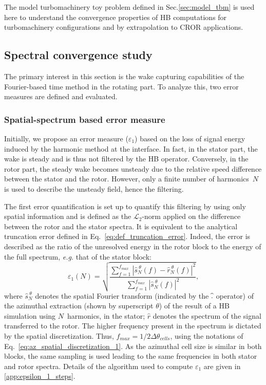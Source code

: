 
The model turbomachinery toy problem defined
in Sec.\ref{sec:model_tbm} is used here to 
understand the convergence properties of HB
computations for turbomachinery configurations
and by extrapolation to CROR applications.

\subsection{Spectral convergence study}
The primary interest in this section is the wake capturing capabilities of the 
Fourier-based time method in the rotating part. 
To analyze this, two error measures are defined and
evaluated. 

\subsubsection{Spatial-spectrum based error measure}
\label{sec:crit_1}
Initially, we propose an error measure ($\varepsilon_1$) based 
on the loss of signal energy
induced by the harmonic method at the interface. 
In fact, in the stator part, the wake is steady and is thus not
filtered by the HB operator. 
Conversely, in the rotor part, the steady wake becomes
unsteady due to the relative speed difference between the
stator and the rotor. However, only a finite number of harmonics~$N$
is used to describe the unsteady field, hence the filtering.

The first error quantification is set up to quantify this filtering 
by using only spatial information and is defined as the $\mathcal{L}_2$-norm 
applied on the 
difference between the rotor and the stator spectra.
It is equivalent to the analytical truncation error 
defined in Eq.~\eqref{eq:def_truncation_error}. 
Indeed, the error is described as the ratio of the unresolved energy 
in the rotor block
to the energy of the full spectrum, 
\emph{e.g.} that of the stator block:
\begin{equation}
    \varepsilon_1(N) = \sqrt{
    \frac{\sum_{f=1}^{f_{max}} | \widehat{s}^{~\theta}_N (f) - 
      \widehat{r}^{~\theta}_N (f)|^2}{ 
    \sum_{f=1}^{f_{max}} | \widehat{s}^{~\theta}_N (f)|^2}},
    \label{eq:def_crit_1}
\end{equation} 
where $\widehat{s}^{~\theta}_N$ denotes the spatial Fourier transform (indicated by
the $\widehat{\vphantom{s}.}$ operator) of the azimuthal extraction (shown
by superscript $\theta$) of the result of a HB simulation using $N$~harmonics,
in the stator; $\widehat{r}$ denotes the spectrum of 
the signal transferred to the rotor.
The higher frequency present in the spectrum is dictated 
by the spatial discretization. Thus, $f_{max} = 1 / 2\Delta \theta_{cells}$, 
using the notations of Eq.~\eqref{eq:az_spatial_discretization_1}.
As the azimuthal cell size is similar in both blocks, 
the same sampling is used leading to the same 
frequencies in both stator and rotor spectra.
Details of the algorithm used to compute $\varepsilon_1$ 
are given in \ref{app:epsilon_1_steps}.

